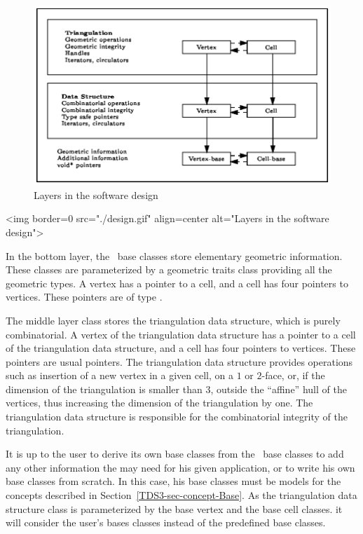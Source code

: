 \begin{ccTexOnly}
\begin{figure}[htbp]

\begin{center} 
\includegraphics{design.eps} 
\end{center}
\caption{Layers in the software design\label{TDS3-fig-layers}} 
\end{figure} 
\end{ccTexOnly}

\begin{ccHtmlOnly}
<img border=0 src="./design.gif" align=center alt="Layers in the software design">
\end{ccHtmlOnly}

In the bottom layer, the \cgal\ base classes store elementary
geometric information.  These classes are parameterized by a geometric
traits class providing all the geometric types. A vertex has a pointer
to a cell, and a cell has four pointers to vertices. These pointers
are of type .

The middle layer class stores the triangulation data structure, which
is purely combinatorial. A vertex of the triangulation data structure
has a pointer to a cell of the triangulation data structure, and a
cell has four pointers to vertices. These pointers are usual
 pointers. The triangulation data structure provides
operations such as insertion of a new vertex in a given cell, on a
$1$ or $2$-face, or, if the dimension of the triangulation is smaller
than 3, outside the ``affine'' hull of the vertices, thus increasing
the dimension of the triangulation by one. The triangulation data
structure is responsible for the combinatorial integrity of the
triangulation. 

It is up to the user to derive its own base classes from the \cgal\
base classes to add any other information the may need for his given
application, or to write his own base classes from scratch. In this
case, his base classes must be models for the concepts described in
Section~\ref{TDS3-sec-concept-Base}. As the triangulation data
structure class is parameterized by the base vertex and the base cell
classes. it will consider the user's bases classes instead of the
predefined base classes.

